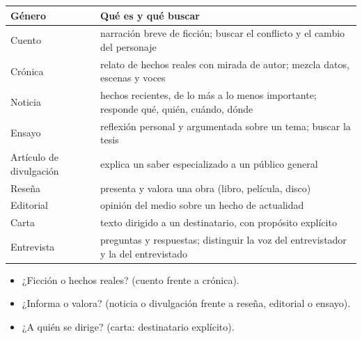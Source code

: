 \begin{center}\small
\begin{tabularx}{\linewidth}{@{}l>{\raggedright\arraybackslash}X@{}}
\toprule
\textbf{Género} & \textbf{Qué es y qué buscar}\\\midrule
Cuento & narración breve de ficción; buscar el conflicto y el cambio del personaje\\
Crónica & relato de hechos reales con mirada de autor; mezcla datos, escenas y voces\\
Noticia & hechos recientes, de lo más a lo menos importante; responde qué, quién, cuándo, dónde\\
Ensayo & reflexión personal y argumentada sobre un tema; buscar la tesis\\
Artículo de divulgación & explica un saber especializado a un público general\\
Reseña & presenta y valora una obra (libro, película, disco)\\
Editorial & opinión del medio sobre un hecho de actualidad\\
Carta & texto dirigido a un destinatario, con propósito explícito\\
Entrevista & preguntas y respuestas; distinguir la voz del entrevistador y la del entrevistado\\\bottomrule
\end{tabularx}
\end{center}

\begin{regla}
\begin{itemize}
  \item ¿Ficción o hechos reales? (cuento frente a crónica).
  \item ¿Informa o valora? (noticia o divulgación frente a reseña, editorial o ensayo).
  \item ¿A quién se dirige? (carta: destinatario explícito).
\end{itemize}
\end{regla}


